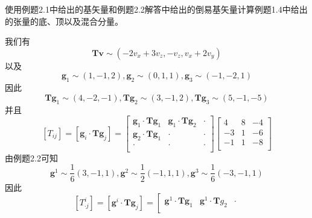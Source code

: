 \begin{example}
    使用例题2.1中给出的基矢量和例题2.2解答中给出的倒易基矢量计算例题1.4中给出的张量的底、顶以及混合分量。
\end{example}
\begin{solution}
    我们有
    \begin{equation*}
        \boldsymbol{Tv}\sim \left( -2v_x+3v_z,-v_z,v_x+2v_y \right) 
    \end{equation*}
    以及
    \begin{equation*}
        \boldsymbol{g}_1\sim \left( 1,-1,2 \right) ,\boldsymbol{g}_2\sim \left( 0,1,1 \right) ,\boldsymbol{g}_3\sim \left( -1,-2,1 \right) 
    \end{equation*}
    因此
    \begin{equation*}
        \boldsymbol{Tg}_1\sim \left( 4,-2,-1 \right) ,\boldsymbol{Tg}_2\sim \left( 3,-1,2 \right) ,\boldsymbol{Tg}_3\sim \left( 5,-1,-5 \right) 
    \end{equation*}
    并且
    \begin{equation*}
        \left[ T_{ij} \right] =\left[ \boldsymbol{g}_i\cdot \boldsymbol{Tg}_j \right] =\left[ \begin{matrix}
            \boldsymbol{g}_1\cdot \boldsymbol{Tg}_1&		\boldsymbol{g}_1\cdot \boldsymbol{Tg}_2&		\cdot\\
            \boldsymbol{g}_2\cdot \boldsymbol{Tg}_1&		\cdot&		\cdot\\
            \cdot&		\cdot&		\cdot\\
        \end{matrix} \right] \left[ \begin{matrix}
            4&		8&		-4\\
            -3&		1&		-6\\
            -1&		1&		-8\\
        \end{matrix} \right] 
    \end{equation*}
    由例题2.2可知
    \begin{equation*}
        \boldsymbol{g}^1\sim \frac{1}{6}(3,-1,1),\boldsymbol{g}^2\sim \frac{1}{2}(-1,1,1),\boldsymbol{g}^3\sim \frac{1}{6}(-3,-1,1)
    \end{equation*}
    因此
    \begin{equation*}
        \left[ T_{\cdot j}^{i} \right] =\left[ \boldsymbol{g}^i\cdot \boldsymbol{Tg}_j \right] =\left[ \begin{matrix}
            \boldsymbol{g}^1\cdot \boldsymbol{Tg}_1&		\boldsymbol{g}^1\cdot \boldsymbol{T}g_2&		\cdot\\

\end{matrix}
\end{equation*}
\end{solution}
